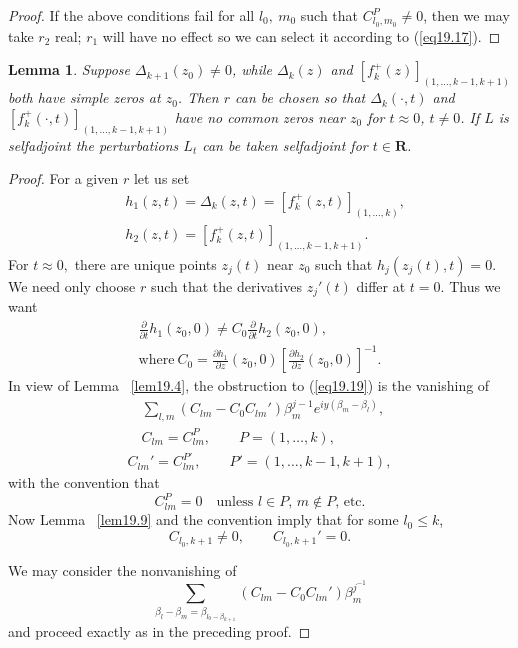 \documentclass{surv-l}
\theoremstyle{plain}
\newtheorem{lemma}[theorem]{Lemma}
\theoremstyle{definition}
\numberwithin{equation}{chapter}
\begin{document}
\begin{proof}
If the above conditions fail for all $l_{0},\ m_{0}$ such that $C_{l_{0},m_{0}}^{P}\neq 0$, then we may take $r_{2}$ real; $r_{1}$ will have no effect so we can select it according to (\ref{eq19.17}).
\end{proof}
\setcounter{theorem}{17}
\begin{lemma}\label{lem19.18} Suppose $\Delta_{k+1}(z_{0})\neq 0$, while $\Delta_{k}(z)$ and $[f_{k}^{+}(z)]_{(1,...,k-1,k+1)}$ both have simple zeros at $z_{0}$.   Then $r$ can be chosen so that $\Delta_{k}(\cdot,t)$ and $[f_{k}^{+}(\cdot,t)]_{(1,\ldots, k-1,k+1)}$ have no common zeros near $z_{0}$ for  $t\approx 0$, $t \neq 0$.  If $L$ is selfadjoint the perturbations $L_{t}$ can be taken selfadjoint for $t\in \mathbf{R}$.
\end{lemma}
\begin{proof} For a given $r$ let us set
\begin{align*}
&h_{1}(z, t)=\Delta_{k}(z,t) = [f_{k}^{+}(z, t)]_{(1,\ldots,k)},\\
&h_{2}(z,t) = [f_{k}^{+}(z,t)]_{(1,\ldots,k-1,k+1)}.
\end{align*}
For $t\approx 0,$ there are unique points $z_{j}(t)$ near $z_{0}$ such that $h_{j}(z_{j}(t),t)=0$. We need only choose $r$ such that the derivatives $z_{j}'(t)$ differ at $t=0$. Thus we want
\setcounter{equation}{18}
\begin{align}\label{eq19.19}
\frac{\partial}{\partial t}h_{1}(z_{0},0)\neq C_{0}\frac{\partial}{\partial t}h_{2}(z_{0},0),\\ \nonumber
\mathrm{where}\ C_{0}=\frac{\partial h_{1}}{\partial z}(z_{0},0)\left[\frac{\partial h_{2}}{\partial z}(z_{0},0)\right]^{-1}.
\end{align}
In view of Lemma ~\ref{lem19.4}, the obstruction to (\ref{eq19.19}) is the vanishing of
\begin{align}\label{eq19.20}
\quad\sum_{l,m}(C_{lm}- C_{0}C_{lm}')\beta_{m}^{j-1}e^{iy(\beta_{m}-\beta_{l})},\\ \nonumber
\quad C_{lm}= C_{lm}^{P},\qquad P=(1,\ldots,k),\\
C_{lm}'= C_{lm}^{P'},\qquad P'= (1,\ldots,k-1,k+1),\nonumber
\end{align}
with the convention that
\begin{equation*}
C_{lm}^{P}=0\quad \text{unless $l\in P$, $m\not\in P$, etc}.
\end{equation*}
Now Lemma ~\ref{lem19.9} and the convention imply that for some $l_{0}\leq k$,
\begin{equation*}
C_{l_{0},k+1}\neq 0,\qquad C_{l_{0},k+1}'= 0.
\end{equation*}

We may consider the nonvanishing of
\begin{equation*}
\sum_{\beta_{l}-\beta_{m}=\beta_{l_{0}-\beta_{k+1}}}(C_{lm}-C_{0}C_{lm}')\beta_{m}^{j^{-1}}
\end{equation*}
and proceed exactly as in the preceding proof.
\end{proof}
\end{document}

